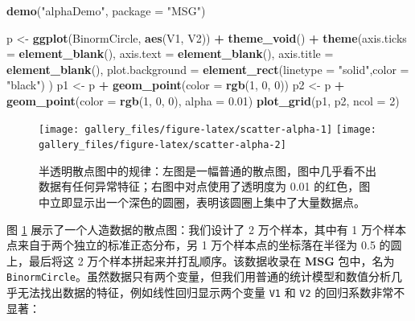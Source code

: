 \documentclass[
  b5paper,
  UTF8,twoside]{book}
\newenvironment{Shaded}{\begin{snugshade}}{\end{snugshade}}
\newcommand{\AttributeTok}[1]{\textcolor[rgb]{0.13,0.29,0.53}{#1}}
\newcommand{\DecValTok}[1]{\textcolor[rgb]{0.00,0.00,0.81}{#1}}
\newcommand{\FloatTok}[1]{\textcolor[rgb]{0.00,0.00,0.81}{#1}}
\newcommand{\FunctionTok}[1]{\textcolor[rgb]{0.13,0.29,0.53}{\textbf{#1}}}
\newcommand{\NormalTok}[1]{#1}
\newcommand{\OtherTok}[1]{\textcolor[rgb]{0.56,0.35,0.01}{#1}}
\newcommand{\SpecialCharTok}[1]{\textcolor[rgb]{0.81,0.36,0.00}{\textbf{#1}}}
\newcommand{\StringTok}[1]{\textcolor[rgb]{0.31,0.60,0.02}{#1}}
\begin{document}
\begin{Shaded}
\begin{Highlighting}[]
\FunctionTok{demo}\NormalTok{(}\StringTok{"alphaDemo"}\NormalTok{, }\AttributeTok{package =} \StringTok{"MSG"}\NormalTok{)}

\NormalTok{p }\OtherTok{\textless{}{-}} \FunctionTok{ggplot}\NormalTok{(BinormCircle, }\FunctionTok{aes}\NormalTok{(V1, V2)) }\SpecialCharTok{+}
  \FunctionTok{theme\_void}\NormalTok{() }\SpecialCharTok{+}
  \FunctionTok{theme}\NormalTok{(}\AttributeTok{axis.ticks =} \FunctionTok{element\_blank}\NormalTok{(), }
    \AttributeTok{axis.text =} \FunctionTok{element\_blank}\NormalTok{(),}
    \AttributeTok{axis.title =} \FunctionTok{element\_blank}\NormalTok{(),}
    \AttributeTok{plot.background =} \FunctionTok{element\_rect}\NormalTok{(}\AttributeTok{linetype =} \StringTok{"solid"}\NormalTok{,}\AttributeTok{color =} \StringTok{"black"}\NormalTok{)}
\NormalTok{  )}
\NormalTok{p1 }\OtherTok{\textless{}{-}}\NormalTok{ p }\SpecialCharTok{+} \FunctionTok{geom\_point}\NormalTok{(}\AttributeTok{color =} \FunctionTok{rgb}\NormalTok{(}\DecValTok{1}\NormalTok{, }\DecValTok{0}\NormalTok{, }\DecValTok{0}\NormalTok{))}
\NormalTok{p2 }\OtherTok{\textless{}{-}}\NormalTok{ p }\SpecialCharTok{+} \FunctionTok{geom\_point}\NormalTok{(}\AttributeTok{color =} \FunctionTok{rgb}\NormalTok{(}\DecValTok{1}\NormalTok{, }\DecValTok{0}\NormalTok{, }\DecValTok{0}\NormalTok{), }\AttributeTok{alpha =} \FloatTok{0.01}\NormalTok{)}
\FunctionTok{plot\_grid}\NormalTok{(p1, p2, }\AttributeTok{ncol =} \DecValTok{2}\NormalTok{)}
\end{Highlighting}
\end{Shaded}

\begin{figure}

{\centering \texttt{[image: gallery\_files/figure-latex/scatter-alpha-1]} \texttt{[image: gallery\_files/figure-latex/scatter-alpha-2]} 

}

\caption[半透明散点图中的规律]{半透明散点图中的规律：左图是一幅普通的散点图，图中几乎看不出数据有任何异常特征；右图中对点使用了透明度为 0.01 的红色，图中立即显示出一个深色的圆圈，表明该圆圈上集中了大量数据点。}\label{fig:scatter-alpha}
\end{figure}

图 \ref{fig:scatter-alpha}
展示了一个人造数据的散点图：我们设计了 2 万个样本，其中有 1 万个样本点来自于两个独立的标准正态分布，另 1 万个样本点的坐标落在半径为 0.5 的圆上，最后将这 2 万个样本拼起来并打乱顺序。该数据收录在 \textbf{MSG} 包中，名为 \texttt{BinormCircle}。虽然数据只有两个变量，但我们用普通的统计模型和数值分析几乎无法找出数据的特征，例如线性回归显示两个变量 \texttt{V1} 和 \texttt{V2} 的回归系数非常不显著：
\end{document}
